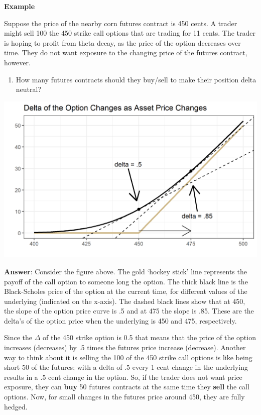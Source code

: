 \documentclass[
  letterpaper,
  DIV=11,
  numbers=noendperiod]{scrreprt}
\providecommand{\tightlist}{%
  \setlength{\itemsep}{0pt}\setlength{\parskip}{0pt}}\usepackage{longtable,booktabs,array}
\begin{document}
\textbf{Example}

Suppose the price of the nearby corn futures contract is 450 cents. A
trader might sell 100 the 450 strike call options that are trading for
11 cents. The trader is hoping to profit from theta decay, as the price
of the option decreases over time. They do not want exposure to the
changing price of the futures contract, however.

\begin{enumerate}
\def\labelenumi{\arabic{enumi}.}
\tightlist
\item
  How many futures contracts should they buy/sell to make their position
  delta neutral?
\end{enumerate}

\includegraphics{assets/Options2-deltahedge.png}

\textbf{Answer}: Consider the figure above. The gold `hockey stick' line
represents the payoff of the call option to someone long the option. The
thick black line is the Black-Scholes price of the option at the current
time, for different values of the underlying (indicated on the x-axis).
The dashed black lines show that at 450, the slope of the option price
curve is .5 and at 475 the slope is .85. These are the delta's of the
option price when the underlying is 450 and 475, respectively.

Since the \(\Delta\) of the 450 strike option is 0.5 that means that the
price of the option increases (decreases) by .5 times the futures price
increase (decrease). Another way to think about it is selling the 100 of
the 450 strike call options is like being short 50 of the futures; with
a delta of .5 every 1 cent change in the underlying results in a .5 cent
change in the option. So, if the trader does not want price exposure,
they can \textbf{buy} 50 futures contracts at the same time they
\textbf{sell} the call options. Now, for small changes in the futures
price around 450, they are fully hedged.
\end{document}
